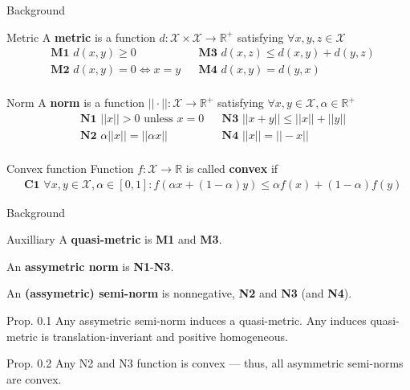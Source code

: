 \documentclass{beamer}
\begin{document}
\begin{frame}{Background}
	\begin{block}{Metric}
        A \textbf{metric} is a function $d: \mathcal{X} \times \mathcal{X} \rightarrow \mathbb{R}^+$ satisfying $\forall x,y,z \in \mathcal{X}$
        \[
        \begin{align*}
        & \textbf{M1  } d(x, y) \geq 0 && \textbf{M3  } d(x, z) \leq d(x, y) + d(y, z) \\
        & \textbf{M2  } d(x, y) = 0 \iff x = y && \textbf{M4  } d(x, y) = d(y, x) \\
        \end{align*}
        \]
	\end{block}
    
    \begin{block}{Norm}
         A \textbf{norm} is a function $||\cdot||: \mathcal{X} \rightarrow \mathbb{R}^+$ satisfying $\forall x,y \in \mathcal{X}, \alpha \in \mathbb{R}^+$
         \[
        \begin{align*}
        & \textbf{N1  } ||x|| > 0 \text{ unless } x = 0 && \textbf{N3  } ||x + y|| \leq ||x|| + ||y|| \\
        & \textbf{N2  } \alpha ||x|| = ||\alpha x|| && \textbf{N4  } ||x|| = ||-x|| \\
        \end{align*}
         \]
    \end{block}

    \begin{block}{Convex function}
         Function $f : \mathcal{X} \rightarrow \mathbb{R}$ is called \textbf{convex} if
         \[
        \begin{align*}
        & \textbf{C1  } \forall x,y  \in \mathcal{X}, \alpha \in [0, 1] : f(\alpha x + (1 - \alpha)y) \leq \alpha f(x) + (1 - \alpha) f(y)
        \end{align*}
        \]
    \end{block}
\end{frame}

\begin{frame}{Background}
    \begin{block}{Auxilliary}
    A \textbf{quasi-metric} is \textbf{M1} and \textbf{M3}.

    An \textbf{assymetric norm} is \textbf{N1}-\textbf{N3}.

    An \textbf{(assymetric) semi-norm} is nonnegative, \textbf{N2} and \textbf{N3} (and \textbf{N4}).
    \end{block}

    \begin{block}{Prop. 0.1}
         Any assymetric semi-norm induces a quasi-metric. Any induces quasi-metric is translation-inveriant and positive homogeneous.
    \end{block}

    \begin{block}{Prop. 0.2}
         Any N2 and N3 function is convex — thus, all asymmetric semi-norms are convex.
    \end{block}
    
\end{frame}
\end{document}
